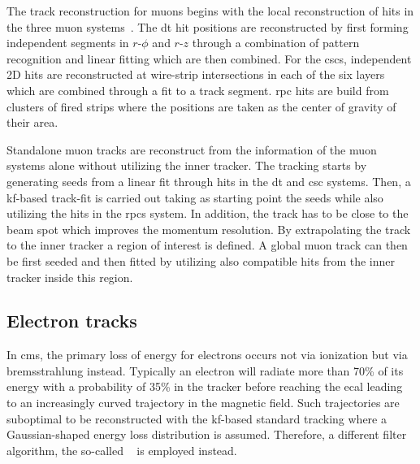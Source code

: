 The track reconstruction for muons begins with the local reconstruction of hits in the three muon systems~\cite{Bayatian:922757}. The \gls{dt} hit positions are reconstructed by first forming independent segments in $r\text{-}\phi$ and $r\text{-}z$ through a combination of pattern recognition and linear fitting which are then combined. For the \glspl{csc}, independent 2D hits are reconstructed at wire-strip intersections in each of the six layers which are combined through a fit to a track segment. \gls{rpc} hits are build from clusters of fired strips where the positions are taken as the  center of gravity of their area.

Standalone muon tracks are reconstruct from the information of the muon systems alone without utilizing the inner tracker. The tracking starts by generating seeds from a linear fit through hits in the \gls{dt} and \gls{csc} systems. Then, a \gls{kf}-based track-fit is carried out taking as starting point the seeds while also utilizing the hits in the \glspl{rpc} system. In addition, the track has to be close to the beam spot which improves the momentum resolution. By extrapolating the track to the inner tracker a region of interest is defined. A global muon track can then be first seeded and then fitted by utilizing also compatible hits from the inner tracker inside this region.


\subsection{Electron tracks}
\label{sec:reconstruction-electrontracks}

In \gls{cms}, the primary loss of energy for electrons occurs not via ionization but via bremsstrahlung instead. Typically an electron will radiate more than 70\% of its energy with a probability of 35\% in the tracker before reaching the \gls{ecal} leading to an increasingly curved trajectory in the magnetic field. Such trajectories are suboptimal to be reconstructed with the \gls{kf}-based standard tracking where a Gaussian-shaped energy loss distribution is assumed. Therefore, a different filter algorithm, the so-called ~\cite{0954-3899-31-9-N01} is employed instead.

